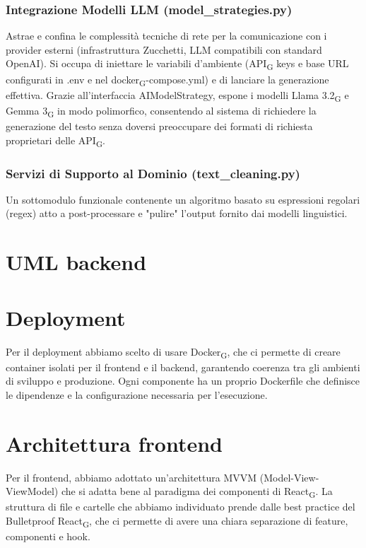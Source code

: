 \documentclass[11pt,a4paper]{article}
\newcommand{\gls}[1]{#1\textsubscript{G}}
\begin{document}
\subsubsection{Integrazione Modelli LLM (model\_strategies.py)}
Astrae e confina le complessità tecniche di rete per la comunicazione con i provider esterni (infrastruttura Zucchetti, LLM compatibili con standard OpenAI). Si occupa di iniettare le variabili d'ambiente (\gls{API} keys e base URL configurati in .env e nel \gls{docker}-compose.yml) e di lanciare la generazione effettiva. Grazie all'interfaccia AIModelStrategy, espone i modelli \gls{Llama 3.2} e \gls{Gemma 3} in modo polimorfico, consentendo al sistema di richiedere la generazione del testo senza doversi preoccupare dei formati di richiesta proprietari delle \gls{API}.

\subsubsection{Servizi di Supporto al Dominio (text\_cleaning.py)}
Un sottomodulo funzionale contenente un algoritmo basato su espressioni regolari (regex) atto a post-processare e "pulire" l'output fornito dai modelli linguistici. 

\section{UML backend}


\section{Deployment}
Per il deployment abbiamo scelto di usare \gls{Docker}, che ci permette di creare container isolati per il frontend e il backend, 
garantendo coerenza tra gli ambienti di sviluppo e produzione. Ogni componente ha un proprio Dockerfile che definisce 
le dipendenze e la configurazione necessaria per l'esecuzione. \\

\section{Architettura frontend}
Per il frontend, abbiamo adottato un'architettura MVVM (Model-View-ViewModel) che si adatta bene al paradigma dei componenti di \gls{React}.
La struttura di file e cartelle che abbiamo individuato prende dalle best practice del Bulletproof \gls{React}, 
che ci permette di avere una chiara separazione di feature, componenti e hook.
\end{document}
